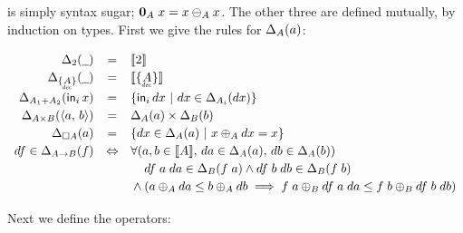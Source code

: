 \documentclass{article}
\theoremstyle{plain}
\theoremstyle{definition}
\begin{document}
\zero{} is simply syntax sugar; $\mathbf{0}_A\; x = x \ominus_A x$. The other three
are defined mutually, by induction on types. First we give the rules for
$\Delta_{A}({a})$:

\[
\def\arraystretch{1.2}
\begin{array}{rcl}
  \Change{\tbool}{\pwild} &=& \Den{\tbool}
  \\
  \Change{\Seteq{A}}{\pwild} &=& \Den{\Seteq{A}}
  \\
  \Change{A_1 + A_2}{\inj{i}{x}}
  &=& \setfor{\inj{i}{dx}}{dx \in \Change{A_i}{dx}}
  \\
  \Change{A \x B}{\pair{a}{b}}
  &=& \Change{A}{a} \x \Change{B}{b}
  \\
  \Change{\Disc{A}}{a}
  &=& \setfor{dx \in \Change{A}{a}}{x \oplus_A dx = x}
  \\
  df \in \Change{A \to B}{f}
  &\Leftrightarrow&
  \forall({a,b \in \Den{A}},\, da \in \Change{A}{a},\, db \in \Change{A}{b})\\
  &&\phantom{{}\wedge{}}
  df\; a\; da \in \Change{B}{f\; a}
  \wedge df\;b\;db \in \Change{B}{f\; b}
  \\
  &&{}\wedge (a \oplus_A da \le b \oplus_A db \implies
  f\;a \oplus_B df\;a\;da \le f\;b \oplus_B df\;b\;db)
\end{array}
\]

Next we define the operators:
\begin{center}
\end{center}
\end{document}

